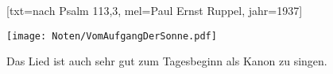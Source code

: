 [txt={nach Psalm 113,3}, mel={Paul Ernst Ruppel}, jahr={1937}]

\markboth{\songtitle}{\songtitle}

\beginverse
\endverse

\centering\texttt{[image: Noten/VomAufgangDerSonne.pdf]}

\endsong

\beginscripture{}
Das Lied ist auch sehr gut zum Tagesbeginn als Kanon zu singen.
\endscripture

\begin{intersong}

\end{intersong}